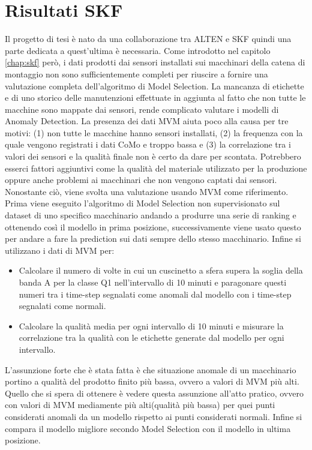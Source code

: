 \section{Risultati SKF}
Il progetto di tesi è nato da una collaborazione tra ALTEN e SKF quindi una parte dedicata a quest'ultima è necessaria. Come introdotto nel capitolo \ref{chap:skf} però, i dati prodotti dai sensori installati sui macchinari della catena di montaggio non sono sufficientemente completi per riuscire a fornire una valutazione completa dell'algoritmo di Model Selection. La mancanza di etichette e di uno storico delle manutenzioni effettuate in aggiunta al fatto che non tutte le macchine sono mappate dai sensori, rende complicato valutare i modelli di Anomaly Detection. La presenza dei dati MVM aiuta poco alla causa per tre motivi: (1) non tutte le macchine hanno sensori installati, (2) la frequenza con la quale vengono registrati i dati CoMo e troppo bassa e (3) la correlazione tra i valori dei sensori e la qualità finale non è certo da dare per scontata. Potrebbero esserci fattori aggiuntivi come la qualità del materiale utilizzato per la produzione oppure anche problemi ai macchinari che non vengono captati dai sensori. 
Nonostante ciò, viene svolta una valutazione usando MVM come riferimento. Prima viene eseguito l'algoritmo di Model Selection non supervisionato sul dataset di uno specifico macchinario andando a produrre una serie di ranking e ottenendo così il modello in prima posizione, successivamente viene usato questo per andare a fare la prediction sui dati sempre dello stesso macchinario. Infine si utilizzano i dati di MVM per:
\begin{itemize}
	\item Calcolare il numero di volte in cui un cuscinetto a sfera supera la soglia della banda A per la classe Q1 nell'intervallo di 10 minuti e paragonare questi numeri tra i time-step segnalati come anomali dal modello con i time-step segnalati come normali.
	\item Calcolare la qualità media per ogni intervallo di 10 minuti e misurare la correlazione tra la qualità con le etichette generate dal modello per ogni intervallo.
\end{itemize}
L'assunzione forte che è stata fatta è che situazione anomale di un macchinario portino a qualità del prodotto finito più bassa, ovvero a valori di MVM più alti. Quello che si spera di ottenere è vedere questa assunzione all'atto pratico, ovvero con valori di MVM mediamente più alti(qualità più bassa) per quei punti considerati anomali da un modello rispetto ai punti considerati normali.
Infine si compara il modello migliore secondo Model Selection con il modello in ultima posizione.

